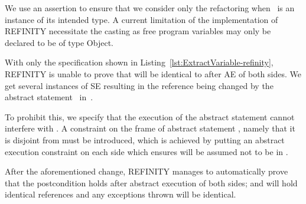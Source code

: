 
We use an assertion to ensure that we consider only the refactoring when~ is an instance of its intended type.
A current limitation of the implementation of REFINITY necessitate the casting  as free program variables may only be declared to be of type Object.

With only the specification shown in Listing~\ref{lst:ExtractVariable-refinity}, REFINITY is unable to prove that  will be identical to  after AE of both sides.
We get several instances of SE resulting in the reference  being changed by the abstract statement~ in~.

To prohibit this, we specify that the execution of the abstract statement  cannot interfere with .
A constraint on the frame  of abstract statement ,
namely that it is disjoint from  must be introduced, which is
achieved by putting an abstract execution constraint  on each side which ensures 
will be assumed not to be in .

After the aforementioned change, REFINITY manages to automatically prove that the postcondition holds after abstract execution of both sides;
 and  will hold identical references and any exceptions thrown will be identical.

